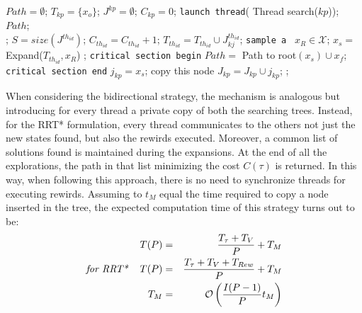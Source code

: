 \begin{algorithm}
\caption{}\label{alg:RRT_single_MT_02}
\begin{algorithmic}[1]
\State $Path = \emptyset$;
\State $T_{kp}=\lbrace x_o \rbrace$;
\State $J^{kp}=\emptyset$;
\State $C_{kp}=0$;
\State \texttt{launch thread}( Thread search($kp$));
\EndFor
\State \Return $Path$;
\EndProcedure
\\
	\Return;
	\EndIf
	\State $S=size(J^{th_{id}})$;
		\State $C_{th_{id}}=C_{th_{id}}+1$;
		\State $T_{th_{id}} = T_{th_{id}} \cup J^{th_{id}}_{kj}$;
	\EndFor
	\State \texttt{sample a}\,\,\, $x_R \in  \mathcal{X}$;
	\State $x_s =$ Expand($T_{th_{id}} , x_R$) ;
		\State \texttt{critical section begin}
		\State $Path=$ Path to root$(x_s) \cup x_f$;	
		\State \texttt{critical section end}
			\State $j_{kp}=x_s$; \Comment copy this node
			\State $J_{kp}= J_{kp} \cup j_{kp}$;
			\EndIf
			\EndFor
		\State \Return;
	\EndIf
\EndFor
\EndProcedure
\end{algorithmic}
\end{algorithm}

When considering the bidirectional strategy, the mechanism is analogous but introducing for every thread  a private copy of both the searching trees. Instead, for the RRT* formulation, every thread communicates to the others not just the new states found, but also the rewirds executed.
Moreover, a common list of solutions found is maintained during the expansions. At the end of all the explorations, the path in that list minimizing the cost $C(\tau)$ is returned.
In this way, when following this approach, there is no need to synchronize threads for executing rewirds.
Assuming to $t_M$ equal the time required to copy a node inserted in the tree, the expected computation time of this strategy turns out to be:
\begin{eqnarray}
T(P) &=& \frac{T_{\tau} + T_V }{P} + T_M  \nonumber\\
\textit{for RRT*  \,\,\,\,\,}  T(P) &=& \frac{T_{\tau} + T_V + T_{Rew} }{P} + T_M \nonumber\\
T_M  & = & \mathcal{O} \left(  \frac{I(P-1)}{P} t_M \right)
\end{eqnarray}  

